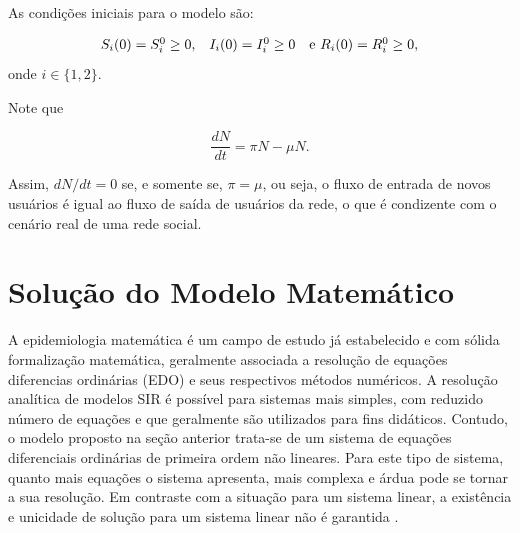 \documentclass[
	12pt,				%
	openright,			%
	oneside,			%
	a4paper,			%
	english,			%
	french,				%
	spanish,			%
	brazil				%
	]{abntex2}
\newcommand{\grifar}[1]{\textcolor{Red}{\textbf{#1}}}
\begin{document}

As condições iniciais para o modelo são:

\begin{equation}
  \begin{array}{ccc}
    S_i(0) = S_i^0 \geq 0, & I_i(0) = I_i^0 \geq 0 & $e$\ R_i(0) = R_i^0 \geq 0,
  \end{array} \nonumber
\end{equation}
\noindent onde $i \in \{1, 2\}$.

Note que

\begin{equation}
  \frac{dN}{dt} = \pi N - \mu N. \nonumber
\end{equation}

Assim, $dN/dt = 0$ se, e somente se, $\pi = \mu$, ou seja, o fluxo de
entrada de novos usuários é igual ao fluxo de saída de usuários da
rede, o que é condizente com o cenário real de uma rede social.


\chapter{Solução do Modelo Matemático}
A epidemiologia matemática é um campo de estudo já estabelecido e com
sólida formalização matemática, geralmente associada a resolução de
equações diferencias ordinárias (EDO) e seus respectivos métodos
numéricos.  A resolução analítica de modelos SIR é possível para
sistemas mais simples, com reduzido número de equações e que
geralmente são utilizados para fins
didáticos\cite{santos2012}. Contudo, o modelo proposto na seção
anterior trata-se de um sistema de equações diferenciais ordinárias de
primeira ordem não lineares.  Para este tipo de sistema, quanto mais
equações o sistema apresenta, mais complexa e árdua pode se tornar a
sua resolução. Em contraste com a situação para um sistema linear, a
existência e unicidade de solução para um sistema linear não é
garantida \cite{boyce2003,zill2003}.
\end{document}
